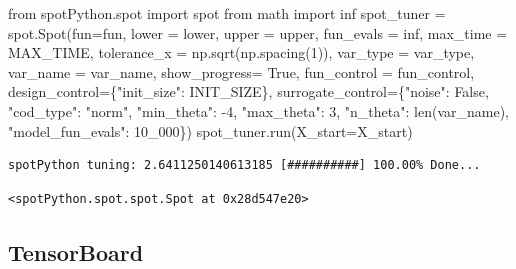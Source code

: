 \documentclass[
  letterpaper,
  DIV=11,
  numbers=noendperiod]{scrreprt}
\newenvironment{Shaded}{\begin{snugshade}}{\end{snugshade}}
\newcommand{\BuiltInTok}[1]{\textcolor[rgb]{0.00,0.23,0.31}{#1}}
\newcommand{\DecValTok}[1]{\textcolor[rgb]{0.68,0.00,0.00}{#1}}
\newcommand{\ImportTok}[1]{\textcolor[rgb]{0.00,0.46,0.62}{#1}}
\newcommand{\NormalTok}[1]{\textcolor[rgb]{0.00,0.23,0.31}{#1}}
\newcommand{\OperatorTok}[1]{\textcolor[rgb]{0.37,0.37,0.37}{#1}}
\newcommand{\StringTok}[1]{\textcolor[rgb]{0.13,0.47,0.30}{#1}}
\newcommand{\VariableTok}[1]{\textcolor[rgb]{0.07,0.07,0.07}{#1}}
\begin{document}
\begin{Shaded}
\begin{Highlighting}[]
\ImportTok{from}\NormalTok{ spotPython.spot }\ImportTok{import}\NormalTok{ spot}
\ImportTok{from}\NormalTok{ math }\ImportTok{import}\NormalTok{ inf}
\NormalTok{spot\_tuner }\OperatorTok{=}\NormalTok{ spot.Spot(fun}\OperatorTok{=}\NormalTok{fun,}
\NormalTok{                   lower }\OperatorTok{=}\NormalTok{ lower,}
\NormalTok{                   upper }\OperatorTok{=}\NormalTok{ upper,}
\NormalTok{                   fun\_evals }\OperatorTok{=}\NormalTok{ inf,}
\NormalTok{                   max\_time }\OperatorTok{=}\NormalTok{ MAX\_TIME,}
\NormalTok{                   tolerance\_x }\OperatorTok{=}\NormalTok{ np.sqrt(np.spacing(}\DecValTok{1}\NormalTok{)),}
\NormalTok{                   var\_type }\OperatorTok{=}\NormalTok{ var\_type,}
\NormalTok{                   var\_name }\OperatorTok{=}\NormalTok{ var\_name,}
\NormalTok{                   show\_progress}\OperatorTok{=} \VariableTok{True}\NormalTok{,}
\NormalTok{                   fun\_control }\OperatorTok{=}\NormalTok{ fun\_control,}
\NormalTok{                   design\_control}\OperatorTok{=}\NormalTok{\{}\StringTok{"init\_size"}\NormalTok{: INIT\_SIZE\},}
\NormalTok{                   surrogate\_control}\OperatorTok{=}\NormalTok{\{}\StringTok{"noise"}\NormalTok{: }\VariableTok{False}\NormalTok{,}
                                      \StringTok{"cod\_type"}\NormalTok{: }\StringTok{"norm"}\NormalTok{,}
                                      \StringTok{"min\_theta"}\NormalTok{: }\OperatorTok{{-}}\DecValTok{4}\NormalTok{,}
                                      \StringTok{"max\_theta"}\NormalTok{: }\DecValTok{3}\NormalTok{,}
                                      \StringTok{"n\_theta"}\NormalTok{: }\BuiltInTok{len}\NormalTok{(var\_name),}
                                      \StringTok{"model\_fun\_evals"}\NormalTok{: }\DecValTok{10\_000}\NormalTok{\})}
\NormalTok{spot\_tuner.run(X\_start}\OperatorTok{=}\NormalTok{X\_start)}
\end{Highlighting}
\end{Shaded}

\begin{verbatim}
spotPython tuning: 2.6411250140613185 [##########] 100.00% Done...
\end{verbatim}

\begin{verbatim}
<spotPython.spot.spot.Spot at 0x28d547e20>
\end{verbatim}

\hypertarget{sec-tensorboard-10}{%
\subsection{TensorBoard}\label{sec-tensorboard-10}}
\end{document}
